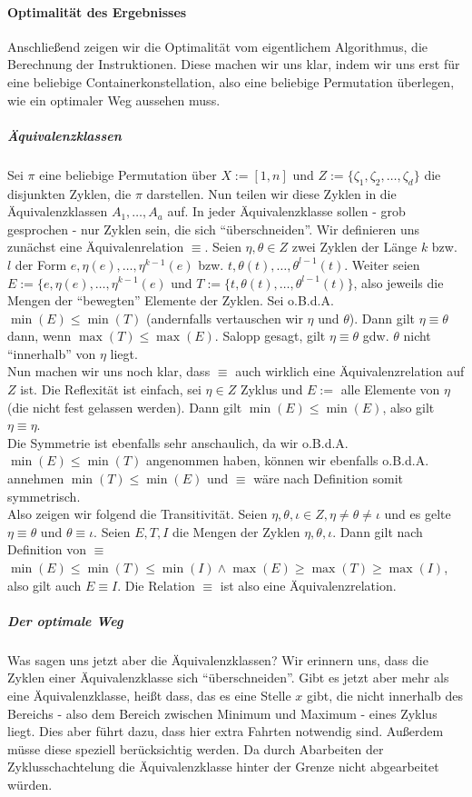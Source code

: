 \paragraph{Optimalität des Ergebnisses}
Anschließend zeigen wir die Optimalität vom eigentlichem Algorithmus, die Berechnung der Instruktionen.
Diese machen wir uns klar, indem wir uns erst für eine beliebige Containerkonstellation, also eine beliebige Permutation überlegen, wie ein optimaler Weg aussehen muss.
\subparagraph{Äquivalenzklassen}
Sei $\pi$ eine beliebige Permutation über $X := [1,n]$ und $Z := \{\zeta_1, \zeta_2, \dots, \zeta_d\}$ die disjunkten Zyklen, die $\pi$ darstellen.
Nun teilen wir diese Zyklen in die Äquivalenzklassen $A_1, \dots, A_a$ auf.
In jeder Äquivalenzklasse sollen - grob gesprochen - nur Zyklen sein, die sich ``überschneiden''.
Wir definieren uns zunächst eine Äquivalenrelation $\equiv$.
Seien $\eta,\theta \in Z$ zwei Zyklen der Länge $k$ bzw. $l$ der Form $e, \eta(e), \dots, \eta^{k-1}(e)$ bzw. $t, \theta(t), \dots, \theta^{l-1}(t)$.
Weiter seien $E := \{e, \eta(e), \dots, \eta^{k-1}(e)$ und $T := \{t, \theta(t), \dots, \theta^{l-1}(t)\}$, also jeweils die Mengen der ``bewegten'' Elemente der Zyklen.
Sei o.B.d.A. $\min(E) \leq \min(T)$ (andernfalls vertauschen wir $\eta$ und $\theta$). Dann gilt $\eta \equiv \theta$ dann, wenn $\max(T) \leq \max(E)$.
Salopp gesagt, gilt $\eta \equiv \theta$ gdw. $\theta$ nicht ``innerhalb'' von $\eta$ liegt. \\
Nun machen wir uns noch klar, dass $\equiv$ auch wirklich eine Äquivalenzrelation auf $Z$ ist.
Die Reflexität ist einfach, sei $\eta \in Z$ Zyklus und $E := $ alle Elemente von $\eta$ (die nicht fest gelassen werden).
Dann gilt $\min(E) \leq \min(E)$, also gilt $\eta \equiv \eta$.\\

Die Symmetrie ist ebenfalls sehr anschaulich, da wir o.B.d.A. $\min(E) \leq \min(T)$ angenommen haben,
können wir ebenfalls o.B.d.A. annehmen $\min(T) \leq \min(E)$ und $\equiv$ wäre nach Definition somit symmetrisch.\\

Also zeigen wir folgend die Transitivität.
Seien $\eta, \theta, \iota \in Z, \eta \neq \theta \neq \iota$ und es gelte $\eta \equiv \theta$ und $\theta \equiv \iota$.
Seien $E,T,I$ die Mengen der Zyklen $\eta, \theta, \iota$.
Dann gilt nach Definition von $\equiv$ $\min(E) \leq \min(T) \leq \min(I) \wedge \max(E) \geq \max(T) \geq \max(I)$, also gilt auch $E \equiv I$.
Die Relation $\equiv$ ist also eine Äquivalenzrelation.
\subparagraph{Der optimale Weg}
Was sagen uns jetzt aber die Äquivalenzklassen? Wir erinnern uns, dass die Zyklen einer Äquivalenzklasse sich ``überschneiden''.
Gibt es jetzt aber mehr als eine Äquivalenzklasse, heißt dass, das es eine Stelle $x$ gibt, die nicht innerhalb des Bereichs - also dem Bereich zwischen Minimum und Maximum - eines Zyklus liegt.
Dies aber führt dazu, dass hier extra Fahrten notwendig sind. Außerdem müsse diese speziell berücksichtig werden.
Da durch Abarbeiten der Zyklusschachtelung die Äquivalenzklasse hinter der Grenze nicht abgearbeitet würden. \\

